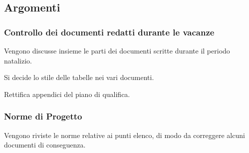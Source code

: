         \subsection{Argomenti}
            \subsubsection{Controllo dei documenti redatti durante le vacanze}
            Vengono discusse insieme le parti dei documenti scritte durante il periodo natalizio.\par
            Si decide lo stile delle tabelle nei vari documenti.\par
            Rettifica appendici del piano di qualifica.
            
            \subsubsection{Norme di Progetto}
            Vengono riviste le norme relative ai punti elenco, di modo da correggere alcuni documenti di conseguenza.
            

